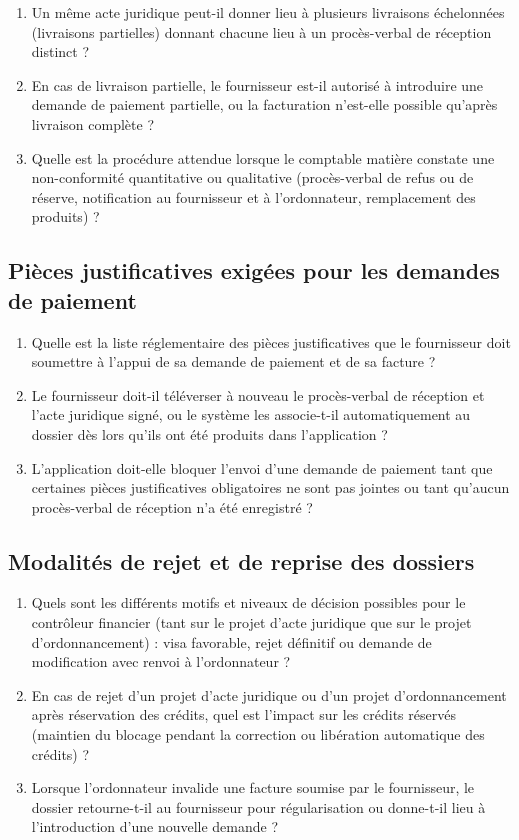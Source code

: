 \begin{enumerate}
  \item Un même acte juridique peut-il donner lieu à plusieurs livraisons échelonnées (livraisons partielles) donnant chacune lieu à un procès-verbal de réception distinct ?
  \item En cas de livraison partielle, le fournisseur est-il autorisé à introduire une demande de paiement partielle, ou la facturation n'est-elle possible qu'après livraison complète ?
  \item Quelle est la procédure attendue lorsque le comptable matière constate une non-conformité quantitative ou qualitative (procès-verbal de refus ou de réserve, notification au fournisseur et à l'ordonnateur, remplacement des produits) ?
\end{enumerate}

\subsection{Pièces justificatives exigées pour les demandes de paiement}

\begin{enumerate}
  \item Quelle est la liste réglementaire des pièces justificatives que le fournisseur doit soumettre à l'appui de sa demande de paiement et de sa facture ?
  \item Le fournisseur doit-il téléverser à nouveau le procès-verbal de réception et l'acte juridique signé, ou le système les associe-t-il automatiquement au dossier dès lors qu'ils ont été produits dans l'application ?
  \item L'application doit-elle bloquer l'envoi d'une demande de paiement tant que certaines pièces justificatives obligatoires ne sont pas jointes ou tant qu'aucun procès-verbal de réception n'a été enregistré ?
\end{enumerate}

\subsection{Modalités de rejet et de reprise des dossiers}

\begin{enumerate}
  \item Quels sont les différents motifs et niveaux de décision possibles pour le contrôleur financier (tant sur le projet d'acte juridique que sur le projet d'ordonnancement) : visa favorable, rejet définitif ou demande de modification avec renvoi à l'ordonnateur ?
  \item En cas de rejet d'un projet d'acte juridique ou d'un projet d'ordonnancement après réservation des crédits, quel est l'impact sur les crédits réservés (maintien du blocage pendant la correction ou libération automatique des crédits) ?
  \item Lorsque l'ordonnateur invalide une facture soumise par le fournisseur, le dossier retourne-t-il au fournisseur pour régularisation ou donne-t-il lieu à l'introduction d'une nouvelle demande ?
\end{enumerate}

